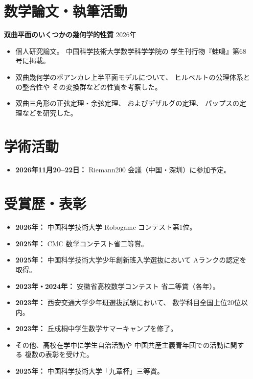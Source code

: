 \documentclass[10pt,a4paper]{article}
\begin{document}
\section*{数学論文・執筆活動}

\textbf{双曲平面のいくつかの幾何学的性質}
\hfill{\small 2026年}\par
\begin{itemize}
\item 個人研究論文。
中国科学技術大学数学科学学院の
学生刊行物『蛙鳴』第68号に掲載。

  \item
  双曲幾何学のポアンカレ上半平面モデルについて、
  ヒルベルトの公理体系との整合性や
  その変換群などの性質を考察した。

  \item
  双曲三角形の正弦定理・余弦定理、
  およびデザルグの定理、
  パップスの定理などを研究した。
\end{itemize}

\section*{学術活動}
\begin{itemize}
\item \textbf{2026年11月20--22日：} Riemann200 会議（中国・深圳）に参加予定。
\end{itemize}
\section*{受賞歴・表彰}

\begin{itemize}
\item \textbf{2026年：} 中国科学技術大学 Robogame コンテスト第1位。
\item \textbf{2025年：} CMC 数学コンテスト省二等賞。

  \item
  \textbf{2025年：}
  中国科学技術大学少年創新班入学選抜において
  Aランクの認定を取得。

  \item
  \textbf{2023年・2024年：}
  安徽省高校数学コンテスト
  省二等賞（各年）。

  \item
  \textbf{2023年：}
  西安交通大学少年班選抜試験において、
  数学科目全国上位20位以内。

  \item
  \textbf{2023年：}
  丘成桐中学生数学サマーキャンプを修了。

  \item
  その他、高校在学中に学生自治活動や
  中国共産主義青年団での活動に関する
  複数の表彰を受けた。

\item \textbf{2025年：} 中国科学技術大学「九章杯」三等賞。
\end{itemize}
\end{document}
